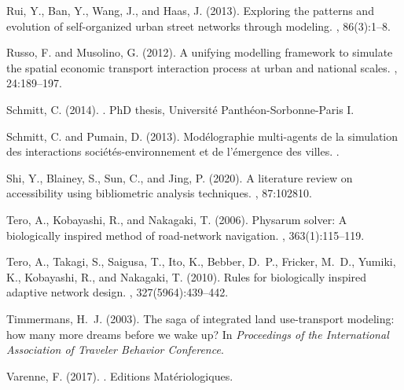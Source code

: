 \documentclass[10pt]{article}
\begin{document}
\begin{thebibliography}{}
Rui, Y., Ban, Y., Wang, J., and Haas, J. (2013).
\newblock Exploring the patterns and evolution of self-organized urban street
  networks through modeling.
, 86(3):1--8.

Russo, F. and Musolino, G. (2012).
\newblock A unifying modelling framework to simulate the spatial economic
  transport interaction process at urban and national scales.
, 24:189--197.

Schmitt, C. (2014).
.
\newblock PhD thesis, Universit{\'e} Panth{\'e}on-Sorbonne-Paris I.

Schmitt, C. and Pumain, D. (2013).
\newblock Mod{\'e}lographie multi-agents de la simulation des interactions
  soci{\'e}t{\'e}s-environnement et de l’{\'e}mergence des villes.
.

Shi, Y., Blainey, S., Sun, C., and Jing, P. (2020).
\newblock A literature review on accessibility using bibliometric analysis
  techniques.
, 87:102810.

Tero, A., Kobayashi, R., and Nakagaki, T. (2006).
\newblock Physarum solver: A biologically inspired method of road-network
  navigation.
,
  363(1):115--119.

Tero, A., Takagi, S., Saigusa, T., Ito, K., Bebber, D.~P., Fricker, M.~D.,
  Yumiki, K., Kobayashi, R., and Nakagaki, T. (2010).
\newblock Rules for biologically inspired adaptive network design.
, 327(5964):439--442.

Timmermans, H.~J. (2003).
\newblock The saga of integrated land use-transport modeling: how many more
  dreams before we wake up?
\newblock In {\em Proceedings of the International Association of Traveler
  Behavior Conference}.

Varenne, F. (2017).
.
\newblock Editions Mat{\'e}riologiques.


\end{thebibliography}
\end{document}
